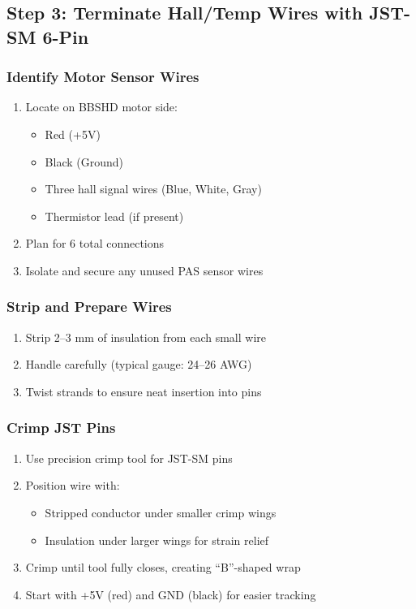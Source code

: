 \documentclass[11pt,a4paper]{article}
\begin{document}
\subsection{Step 3: Terminate Hall/Temp Wires with JST-SM 6-Pin}

\subsubsection{Identify Motor Sensor Wires}
\begin{enumerate}
    \item Locate on BBSHD motor side:
    \begin{itemize}
        \item Red (+5V)
        \item Black (Ground)
        \item Three hall signal wires (Blue, White, Gray)
        \item Thermistor lead (if present)
    \end{itemize}
    \item Plan for 6 total connections
    \item Isolate and secure any unused PAS sensor wires
\end{enumerate}

\subsubsection{Strip and Prepare Wires}
\begin{enumerate}
    \item Strip 2--3 mm of insulation from each small wire
    \item Handle carefully (typical gauge: 24--26 AWG)
    \item Twist strands to ensure neat insertion into pins
\end{enumerate}

\subsubsection{Crimp JST Pins}
\begin{enumerate}
    \item Use precision crimp tool for JST-SM pins
    \item Position wire with:
    \begin{itemize}
        \item Stripped conductor under smaller crimp wings
        \item Insulation under larger wings for strain relief
    \end{itemize}
    \item Crimp until tool fully closes, creating ``B''-shaped wrap
    \item Start with +5V (red) and GND (black) for easier tracking
\end{enumerate}
\end{document}
